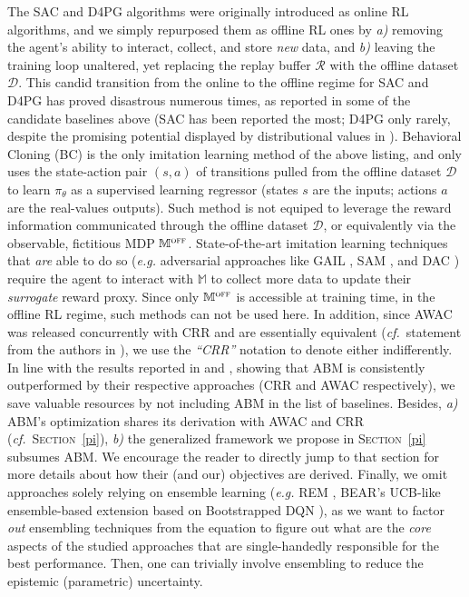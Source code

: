 The SAC \cite{Haarnoja2018-bm} and
D4PG \cite{Barth-Maron2018-ot}
algorithms were originally introduced as online RL algorithms, and we simply repurposed them as offline RL ones
by \textit{a)} removing the agent's ability to interact, collect, and store \textit{new} data, and
\textit{b)} leaving the training loop unaltered, yet replacing the replay buffer $\mathcal{R}$
with the offline dataset $\mathcal{D}$.
This candid transition from the online to the offline regime
for SAC \cite{Haarnoja2018-bm} and
D4PG \cite{Barth-Maron2018-ot}
has proved disastrous numerous times, as reported in
some of the candidate baselines above
(SAC \cite{Haarnoja2018-bm} has been reported the most;
D4PG only rarely, despite the promising potential displayed by distributional values in \cite{Agarwal2020-eu}).
Behavioral Cloning (BC) \cite{Pomerleau1989-nh, Pomerleau1990-lm, Ratliff2007-fc, Bagnell2015-ni}
is the only imitation learning \cite{Bagnell2015-ni}
method of the above listing, and only uses the state-action pair $(s,a)$ of transitions pulled from the
offline dataset $\mathcal{D}$ to learn $\pi_\theta$ as a supervised learning regressor
(states $s$ are the inputs; actions $a$ are the real-values outputs).
Such method is not equiped to leverage the reward information communicated through the offline dataset $\mathcal{D}$,
or equivalently via the observable, fictitious MDP $\mathbb{M}^\textsc{off}$.
State-of-the-art imitation learning techniques that \emph{are} able to do so (\textit{e.g.} adversarial approaches
like GAIL \cite{Ho2016-bv}, SAM \cite{Blonde2019-vc}, and DAC \cite{Kostrikov2019-jo})
require the agent to interact with $\mathbb{M}$ to collect more data to update their \textit{surrogate}
reward proxy. Since only $\mathbb{M}^\textsc{off}$ is accessible at training time,
in the offline RL regime, such methods can not be used here.
In addition, since AWAC \cite{Nair2020-gd}
was released concurrently with CRR \cite{Wang2020-sr}
and are essentially equivalent (\textit{cf.}~statement from the authors in \cite{Nair2020-gd}),
we use the \textit{``CRR''} notation to denote either indifferently.
In line with the results reported in \cite{Wang2020-sr} and \cite{Nair2020-gd},
showing that ABM \cite{Siegel2020-lo}
is consistently outperformed by their respective approaches (CRR and AWAC respectively),
we save valuable resources by not including ABM in the list of baselines.
Besides, \textit{a)} ABM's optimization shares its derivation with AWAC and CRR
(\textit{cf.}~\textsc{Section}~\ref{pi}),
\textit{b)} the generalized framework we propose in \textsc{Section}~\ref{pi} subsumes ABM.
We encourage the reader to directly jump to that section
for more details about how their (and our) objectives are derived.
Finally, we omit approaches solely relying on ensemble learning (\textit{e.g.} REM \cite{Agarwal2020-eu},
BEAR's
UCB-like ensemble-based extension \cite{Kumar2019-rw} based on Bootstrapped DQN \cite{Osband2016-ff}),
as we want to factor \emph{out} ensembling techniques from the equation
to figure out what are the \emph{core} aspects
of the studied approaches that are single-handedly responsible for the best performance.
Then, one can trivially involve ensembling to reduce the epistemic (parametric) uncertainty.

